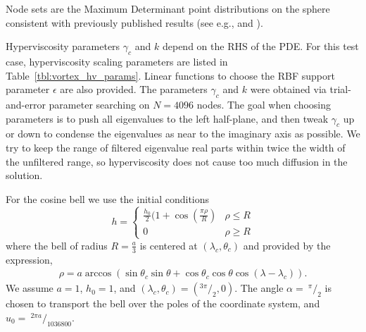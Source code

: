 Node sets are the Maximum Determinant point distributions on the sphere \cite{Sloan2003} consistent with previously published results (see e.g., \cite{Flyer2007} and \cite{Fornberg2011b}).

Hyperviscosity parameters $\gamma_c$ and $k$ depend on the RHS of the PDE. 
For this test case, hyperviscosity scaling parameters are listed in Table~\ref{tbl:vortex_hv_params}. Linear functions to choose the RBF support parameter $\epsilon$ are also provided. The parameters $\gamma_c$ and $k$ were obtained via trial-and-error parameter searching on $N=4096$ nodes. The goal when choosing parameters is to push all eigenvalues to the left half-plane, and then tweak $\gamma_c$ up or down to condense the eigenvalues as near to the imaginary axis as possible. We try to keep the range of filtered eigenvalue real parts within twice the width of the unfiltered range, so hyperviscosity does not cause too much diffusion in the solution. 

For the cosine bell we use the initial conditions
\begin{equation*}
h  = 
\begin{cases} 
\frac{h_0}{2} (1 + \cos(\frac{\pi \rho}{R})  & \rho \le R  \\
 0 &  \rho \geq R 
\end{cases}
\end{equation*}
where the bell of radius $R = \frac{a}{3}$ is centered at $(\lambda_c, \theta_c)$ and provided by the expression,
\begin{eqnarray*}
\rho = a \arccos( \sin \theta_{c} \sin \theta + \cos \theta_{c} \cos \theta \cos (\lambda - \lambda_{c}) ).
\end{eqnarray*}
We assume $a = 1$, $h_0 = 1$, and $(\lambda_c, \theta_c) = (^{3\pi}/_{2}, 0)$. The angle $\alpha =\ ^{\pi}/_{2}$ is chosen to transport the bell over the poles of the coordinate system, and $u_0 =\ ^{2 \pi a}/_{1036800}$. 

